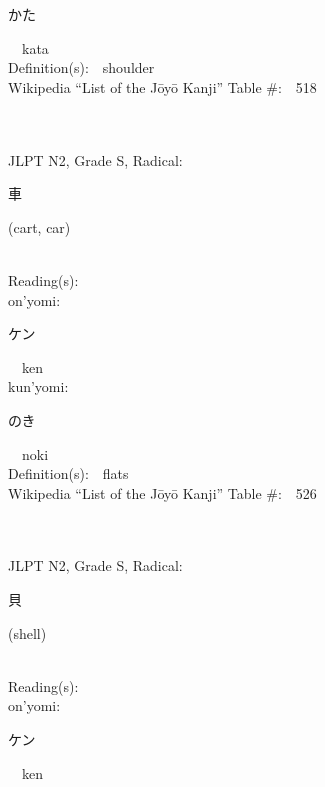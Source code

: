\begin{multicols}{2}
{\hspace*{2em}}{\begin{CJK}{UTF8}{min} かた \end{CJK}}\ \ kata\ \ \\
Definition(s):\ \ shoulder \\
Wikipedia ``List of the J\=oy\=o Kanji'' Table \#:\ \ 518 \\
\ \ \\
{\fontsize{34pt}{40pt}  }\ \ \\  %
{JLPT N2, Grade S, Radical:\ \ {\begin{CJK}{UTF8}{min} 車 \end{CJK}} (cart, car) } \\
Reading(s):\ \ \\
{\hspace*{1em}}on'yomi:\ \ \\
{\hspace*{2em}}{\begin{CJK}{UTF8}{min} ケン \end{CJK}}\ \ ken\ \ \\
{\hspace*{1em}}kun'yomi:\ \ \\
{\hspace*{2em}}{\begin{CJK}{UTF8}{min} のき \end{CJK}}\ \ noki\ \ \\
Definition(s):\ \ flats \\
Wikipedia ``List of the J\=oy\=o Kanji'' Table \#:\ \ 526 \\
\ \ \\
{\fontsize{34pt}{40pt}  }\ \ \\  %
{JLPT N2, Grade S, Radical:\ \ {\begin{CJK}{UTF8}{min} 貝 \end{CJK}} (shell) } \\
Reading(s):\ \ \\
{\hspace*{1em}}on'yomi:\ \ \\
{\hspace*{2em}}{\begin{CJK}{UTF8}{min} ケン \end{CJK}}\ \ ken\ \ \\

\end{multicols}

